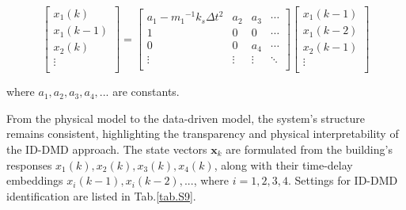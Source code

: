\begin{equation}
    \left[\begin{matrix}
    {{x}_{1}}(k) \\
    {{x}_{1}}(k-1) \\
    {{x}_{2}}(k) \\
    \vdots \\
    \end{matrix} \right]=\left[ \begin{matrix}
    {a}_{1}-{{m}_{1}}^{-1}{k}_{s}\Delta {t}^{2} & {a}_{2} & {a}_{3} & \cdots \\
    1 & 0 & 0 & \cdots \\
    0 & 0 & {a}_{4} & \cdots \\
    \vdots  & \vdots  & \vdots  & \ddots \\
    \end{matrix} \right]\left[\begin{matrix}
    {{x}_{1}}(k-1) \\
    {{x}_{1}}(k-2) \\
    {{x}_{2}}(k-1) \\
    \vdots \\
    \end{matrix} \right] \label{eqS27}
\end{equation}

\noindent where ${a}_{1},{a}_{2},{a}_{3},{a}_{4},...$ are constants.

From the physical model to the data-driven model, the system’s structure remains consistent, highlighting the transparency and physical interpretability of the ID-DMD approach. The state vectors $\mathbf{x}_{k}$ are formulated from the building’s responses ${{x}_{1}}(k),{{x}_{2}}(k),{{x}_{3}}(k),{{x}_{4}}(k)$, along with their time-delay embeddings ${{x}_{i}}(k-1),{{x}_{i}}(k-2),...$, where $i=1,2,3,4$. Settings for ID-DMD identification are listed in Tab.\ref{tab.S9}. 

